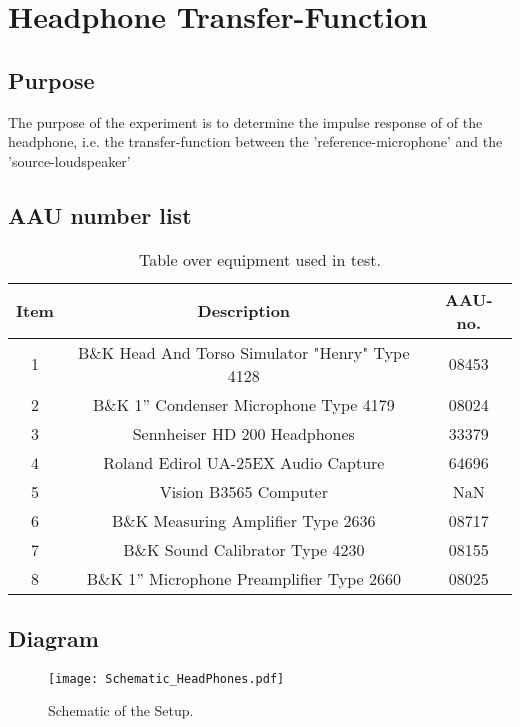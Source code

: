 \section{Headphone Transfer-Function}
\subsection{Purpose}
The purpose of the experiment is to determine the impulse response of of the  headphone, i.e. the transfer-function between the 'reference-microphone' and the 'source-loudspeaker'

\subsection{AAU number list}
\begin{table}[h]
	\centering
	\begin{tabular}{ c c c } \toprule
		{Item}	& {Description} 						& {AAU-no}. \\ \bottomrule 
		1	&	B\&K Head And Torso Simulator "Henry" Type 4128	& 08453		\\
		2	&	B\&K 1'' Condenser Microphone Type 4179 & 08024\\
		3	&	Sennheiser HD 200	Headphones			& 33379		\\
		4	&	Roland Edirol UA-25EX Audio Capture		& 64696		\\
		5	&	Vision B3565 Computer					& NaN		\\
		6	&	B\&K Measuring Amplifier Type 2636	& 08717		\\
		7	&	B\&K Sound Calibrator Type 4230			& 08155		\\ 
		8	&	B\&K 1'' Microphone Preamplifier Type 2660	& 08025		\\
		\bottomrule
	\end{tabular}
	\caption{Table over equipment used in test.}
	\label{tab:UsedEquipmentListningHP}
\end{table}

\subsection{Diagram}
\begin{figure}[H]
	\centering
	\texttt{[image: Schematic\_HeadPhones.pdf]}
	\caption{Schematic of the Setup.}
	\label{Schematic}
\end{figure}


